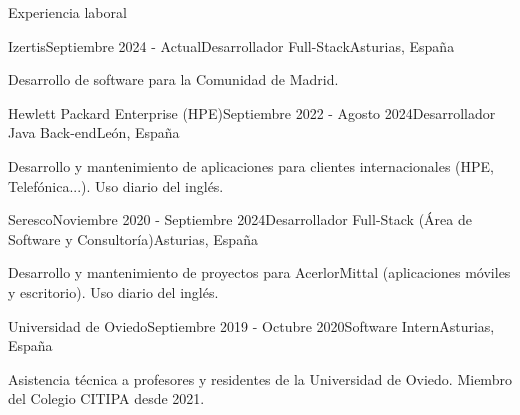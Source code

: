 \documentclass{resume} %
\begin{document}


\begin{rSection}{Experiencia laboral}


\begin{rSubsection}{Izertis}{Septiembre 2024 - Actual}{Desarrollador Full-Stack}{Asturias, España}
\item Desarrollo de software para la Comunidad de Madrid.
\end{rSubsection}

\begin{rSubsection}{Hewlett Packard Enterprise (HPE)}{Septiembre 2022 - Agosto 2024}{Desarrollador Java Back-end}{León, España}
\item Desarrollo y mantenimiento de aplicaciones para clientes internacionales (HPE, Telefónica...). Uso diario del inglés.
\end{rSubsection}

\begin{rSubsection}{Seresco}{Noviembre 2020 - Septiembre 2024}{Desarrollador Full-Stack (Área de Software y Consultoría)}{Asturias, España}
\item Desarrollo y mantenimiento de proyectos para AcerlorMittal (aplicaciones móviles y escritorio). Uso diario del inglés.
\end{rSubsection}

\begin{rSubsection}{Universidad de Oviedo}{Septiembre 2019 - Octubre 2020}{Software Intern}{Asturias, España}
\item Asistencia técnica a profesores y residentes de la Universidad de Oviedo. Miembro del Colegio CITIPA desde 2021.
\end{rSubsection}

\end{rSection}

\end{document}
